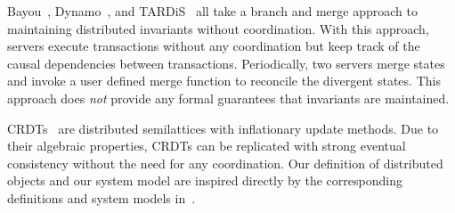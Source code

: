 Bayou~\cite{terry1995managing}, Dynamo~\cite{decandia2007dynamo}, and
TARDiS~\cite{crooks2016tardis} all take a branch and merge approach to
maintaining distributed invariants without coordination. With this approach,
servers execute transactions without any coordination but keep track of the
causal dependencies between transactions. Periodically, two servers merge
states and invoke a user defined merge function to reconcile the divergent
states. This approach does \emph{not} provide any formal guarantees that
invariants are maintained.

CRDTs~\cite{shapiro2011conflict, shapiro2011comprehensive} are distributed
semilattices with inflationary update methods. Due to their algebraic
properties, CRDTs can be replicated with strong eventual consistency without
the need for any coordination. Our definition of distributed objects and our
\invariantconfluence{} system model are inspired directly by the corresponding
definitions and system models in~\cite{shapiro2011conflict}.

%


